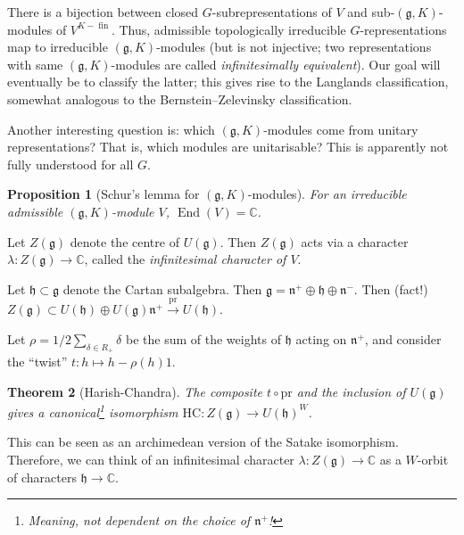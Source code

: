 \documentclass[11pt]{report}
\let\mf\mathfrak
\newcommand{\1}{\mathbbm 1}
\newcommand{\g}{\mf g}
\newcommand{\C}{\mathbb{C}}
\DeclareMathOperator{\fin}{fin}
\DeclareMathOperator{\End}{End}
\theoremstyle{plain}
\newtheorem{thm}{Theorem}[section]
\newtheorem{prop}[thm]{Proposition}
\theoremstyle{definition}
\theoremstyle{remark}
\numberwithin{equation}{section}
\begin{document}
There is a bijection between closed $G$-subrepresentations of $V$ and
sub-$(\g,K)$-modules of $V^{K-\fin}$. Thus, admissible topologically
irreducible $G$-representations map to irreducible $(\g,K)$-modules
(but is not injective; two representations with same $(\g,K)$-modules
are called \emph{infinitesimally equivalent}). Our goal will
eventually be to classify the latter; this gives rise to the Langlands
classification, somewhat analogous to the Bernstein--Zelevinsky
classification.

Another interesting question is: which $(\g,K)$-modules come from
unitary representations? That is, which modules are unitarisable? This
is apparently not fully understood for all $G$.

\begin{prop}[Schur's lemma for $(\g,K)$-modules]
For an irreducible admissible $(\g,K)$-module $V$, $\End(V) = \C$. 
\end{prop}
Let $Z(\g)$ denote the centre of $U(\g)$. Then $Z(\g)$ acts via a
character $\lambda \colon Z(\g)\to \C$, called the \emph{infinitesimal
  character of $V$}.


Let $\mf h \subset \g$ denote the Cartan subalgebra. Then
$\g = \mf n^{+} \oplus \mf h \oplus \mf n^{-}$. Then (fact!)
$Z(\g) \subset U(\mf h)\oplus U(\g)\mf n^{+} \xrightarrow{\mathrm{pr}} U(\mf h)$. 

Let $\rho = 1/2\sum_{\delta \in R_{+}}\delta$ be the sum of the weights of $\mf h$
acting on $\mf n^{+}$, and consider the ``twist'' $t : h \mapsto h-\rho(h)1$. 
\begin{thm}[Harish-Chandra]
  The composite $t\circ\mathrm{pr}$ and the inclusion of
  $U(\g)$ gives a canonical\footnote{Meaning, not dependent on the
    choice of $\mf n^{+}$!} isomorphism
  $\mathrm{HC}\colon Z(\g) \to U(\mf h)^{W}$.
\end{thm}
This can be seen as an archimedean version of the Satake isomorphism.
Therefore, we can think of an infinitesimal character $\lambda \colon Z(\g)
\to \C$ as a $W$-orbit of characters $\mf h \to \C$. 
\end{document}
